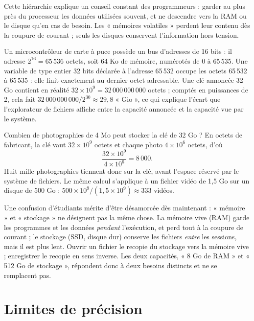 Cette hiérarchie explique un conseil constant des programmeurs : garder au plus près du processeur les données utilisées souvent, et ne descendre vers la RAM ou le disque qu'en cas de besoin. Les « mémoires volatiles » perdent leur contenu dès la coupure de courant ; seuls les disques conservent l'information hors tension.

\begin{exemple}
Un microcontrôleur de carte à puce possède un bus d'adresses de 16 bits : il adresse $2^{16} = 65\,536$ octets, soit 64 Ko de mémoire, numérotés de 0 à 65\,535. Une variable de type entier 32 bits déclarée à l'adresse 65\,532 occupe les octets 65\,532 à 65\,535 : elle finit exactement au dernier octet adressable. Une clé annoncée 32 Go contient en réalité $32 \times 10^{9} = 32\,000\,000\,000$ octets ; comptés en puissances de 2, cela fait $32\,000\,000\,000 / 2^{30} \approx 29{,}8$ « Gio », ce qui explique l'écart que l'explorateur de fichiers affiche entre la capacité annoncée et la capacité vue par le système.
\end{exemple}

\begin{exemple}
Combien de photographies de 4 Mo peut stocker la clé de 32 Go ? En octets de fabricant, la clé vaut $32 \times 10^{9}$ octets et chaque photo $4 \times 10^{6}$ octets, d'où
\[
\frac{32 \times 10^{9}}{4 \times 10^{6}} = 8\,000 .
\]
Huit mille photographies tiennent donc sur la clé, avant l'espace réservé par le système de fichiers. Le même calcul s'applique à un fichier vidéo de 1,5 Go sur un disque de 500 Go : $500 \times 10^{9} / (1{,}5 \times 10^{9}) \approx 333$ vidéos.
\end{exemple}

Une confusion d'étudiants mérite d'être désamorcée dès maintenant : « mémoire » et « stockage » ne désignent pas la même chose. La mémoire vive (RAM) garde les programmes et les données \emph{pendant} l'exécution, et perd tout à la coupure de courant ; le stockage (SSD, disque dur) conserve les fichiers \emph{entre} les sessions, mais il est plus lent. Ouvrir un fichier le recopie du stockage vers la mémoire vive ; enregistrer le recopie en sens inverse. Les deux capacités, « 8 Go de RAM » et « 512 Go de stockage », répondent donc à deux besoins distincts et ne se remplacent pas.

\section{Limites de précision}

